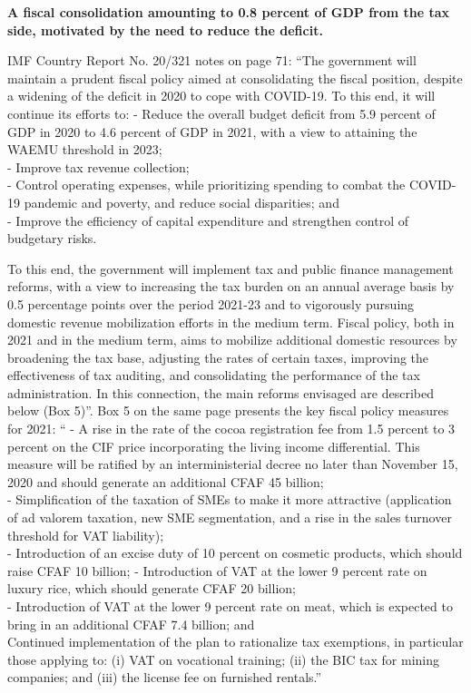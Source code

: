 \textbf{A fiscal consolidation amounting to 0.8 percent of GDP from the tax side, motivated by the need to reduce the deficit.} 

IMF Country Report No. 20/321 notes on page 71: “The government will maintain a prudent fiscal policy aimed at consolidating the fiscal position, despite a widening of the deficit in 2020 to cope with COVID-19. To this end, it will continue its efforts to:
- Reduce the overall budget deficit from 5.9 percent of GDP in 2020 to 4.6 percent of GDP in 2021, with a view to attaining the WAEMU threshold in 2023;\\
- Improve tax revenue collection;\\
- Control operating expenses, while prioritizing spending to combat the COVID-19 pandemic and poverty, and reduce social disparities; and\\
- Improve the efficiency of capital expenditure and strengthen control of budgetary risks. 

To this end, the government will implement tax and public finance management reforms, with a view to increasing the tax burden on an annual average basis by 0.5 percentage points over the period 2021-23 and to vigorously pursuing domestic revenue mobilization efforts in the medium term. Fiscal policy, both in 2021 and in the medium term, aims to mobilize additional domestic resources by broadening the tax base, adjusting the rates of certain taxes, improving the effectiveness of tax auditing, and consolidating the performance of the tax administration. In this connection, the main reforms envisaged are described below (Box 5)”. Box 5 on the same page presents the key fiscal policy measures for 2021: “
- A rise in the rate of the cocoa registration fee from 1.5 percent to 3 percent on the CIF price incorporating the living income differential. This measure will be ratified by an interministerial decree no later than November 15, 2020 and should generate an additional CFAF 45 billion;\\
- Simplification of the taxation of SMEs to make it more attractive (application of ad valorem taxation, new SME segmentation, and a rise in the sales turnover threshold for VAT liability);\\
- Introduction of an excise duty of 10 percent on cosmetic products, which should raise CFAF 10 billion;
- Introduction of VAT at the lower 9 percent rate on luxury rice, which should generate CFAF 20 billion;\\
- Introduction of VAT at the lower 9 percent rate on meat, which is expected to bring in an additional CFAF 7.4 billion; and\\
Continued implementation of the plan to rationalize tax exemptions, in particular those applying to: (i) VAT on vocational training; (ii) the BIC tax for mining companies; and (iii) the license fee on furnished rentals.”
 

